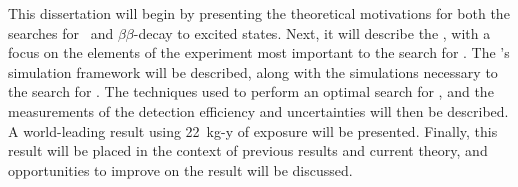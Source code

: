 {This dissertation will begin by presenting the theoretical motivations for both the searches for \znbb\ and $\beta\beta$-decay to excited states.
Next, it will describe the \MJD, with a focus on the elements of the experiment most important to the search for \bbes.
The \Demo 's simulation framework will be described, along with the simulations necessary to the search for \bbes.
The techniques used to perform an optimal search for \bbes, and the measurements of the detection efficiency and uncertainties will then be described.
A world-leading result using 22~kg-y of exposure will be presented.
Finally, this result will be placed in the context of previous results and current theory, and opportunities to improve on the result will be discussed.
}
